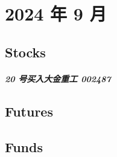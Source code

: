 \chapter{2024 年 9 月}
\section{Stocks}
\paragraph{20 号买入大金重工 002487}
\section{Futures}
\section{Funds}